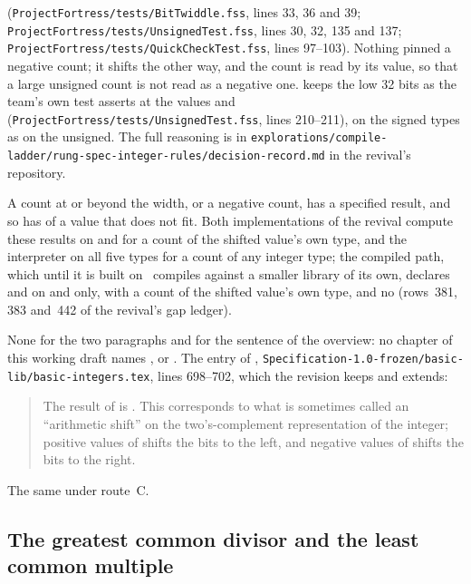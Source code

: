 \begin{description}
(\nolinkurl{ProjectFortress/tests/BitTwiddle.fss}, lines 33, 36 and 39;
\nolinkurl{ProjectFortress/tests/UnsignedTest.fss}, lines 30, 32, 135 and 137;
\nolinkurl{ProjectFortress/tests/QuickCheckTest.fss}, lines 97--103).
Nothing pinned a negative count; it shifts the other way, and the count is read by
its value, so that a large unsigned count is not read as a negative one.
 keeps the low 32 bits as the team's own test asserts at the values
 and  (\nolinkurl{ProjectFortress/tests/UnsignedTest.fss},
lines 210--211), on the signed types as on the unsigned.
The full reasoning is in
\nolinkurl{explorations/compile-ladder/rung-spec-integer-rules/decision-record.md}
in the revival's repository.
\item[Effect] A count at or beyond the width, or a negative count, has a specified
result, and so has  of a value that does not fit.
Both implementations of the revival compute these results on  and
 for a count of the shifted value's own type, and the interpreter
on all five types for a count of any integer type; the compiled path, which until it
is built on \library\ compiles against a smaller library of its own, declares
 and  on  and  only, with
a count of the shifted value's own type, and no  (rows~381, 383 and~442
of the revival's gap ledger).
\item[Original text] None for the two paragraphs and for the sentence of the
overview: no chapter of this working draft names ,  or
.
The entry of ,
\nolinkurl{Specification-1.0-frozen/basic-lib/basic-integers.tex}, lines 698--702,
which the revision keeps and extends:
\begin{quote}
The result of  is .
This corresponds to what is sometimes called an ``arithmetic shift''
on the two's-complement representation of the integer;
positive values of  shifts the bits to the left,
and negative values of  shifts the bits to the right.
\end{quote}
\item[Route C] The same under route~C.
\end{description}

\subsection{The greatest common divisor and the least common multiple}

